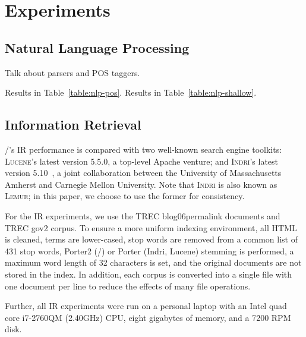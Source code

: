 \section{Experiments}
\label{sec:experiments}

\subsection{Natural Language Processing}

Talk about parsers and POS taggers.

Results in Table~\ref{table:nlp-pos}.
Results in Table~\ref{table:nlp-shallow}.





\subsection{Information Retrieval}

\meta/'s IR performance is compared with two well-known search engine toolkits:
\textsc{Lucene}'s latest version 5.5.0\footnotemark[12], a top-level Apache
venture; and \textsc{Indri}'s latest version 5.10~\cite{lemur}, a joint
collaboration between the University of Massachusetts Amherst and Carnegie
Mellon University. Note that \textsc{Indri} is also known as \textsc{Lemur}; in
this paper, we choose to use the former for consistency.


For the IR experiments, we use the TREC blog06\footnotemark[7] permalink
documents and TREC gov2 corpus\footnotemark[8].
To ensure a more uniform indexing environment, all HTML is cleaned, terms are
lower-cased, stop words are removed from a common list of 431 stop words,
Porter2 (\meta/) or Porter (Indri, Lucene) stemming is performed, a maximum word
length of 32 characters is set, and the original documents are not stored in the
index. In addition, each corpus is converted into a single file with one
document per line to reduce the effects of many file operations.


Further, all IR experiments were run on a personal laptop with an Intel quad
core i7-2760QM (2.40GHz) CPU, eight gigabytes of memory, and a 7200 RPM disk.

